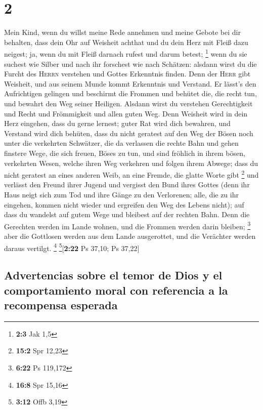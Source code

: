 \hypertarget{section-1}{%
\section{2}\label{section-1}}

 Mein Kind, wenn du willst meine Rede annehmen und meine
Gebote bei dir behalten,  dass dein Ohr auf Weisheit
achthat und du dein Herz mit Fleiß dazu neigest;  ja, wenn
du mit Fleiß darnach rufest und darum betest; \footnote{\textbf{2:3} Jak
  1,5}  wenn du sie suchest wie Silber und nach ihr
forschest wie nach Schätzen:  alsdann wirst du die Furcht
des \textsc{Herrn} verstehen und Gottes Erkenntnis finden.
 Denn der \textsc{Herr} gibt Weisheit, und aus seinem
Munde kommt Erkenntnis und Verstand.  Er lässt's den
Aufrichtigen gelingen und beschirmt die Frommen  und
behütet die, die recht tun, und bewahrt den Weg seiner Heiligen.
 Alsdann wirst du verstehen Gerechtigkeit und Recht und
Frömmigkeit und allen guten Weg.  Denn Weisheit wird in
dein Herz eingehen, dass du gerne lernest;  guter Rat
wird dich bewahren, und Verstand wird dich behüten,  dass
du nicht geratest auf den Weg der Bösen noch unter die verkehrten
Schwätzer,  die da verlassen die rechte Bahn und gehen
finstere Wege,  die sich freuen, Böses zu tun, und sind
fröhlich in ihrem bösen, verkehrten Wesen,  welche ihren
Weg verkehren und folgen ihrem Abwege;  dass du nicht
geratest an eines anderen Weib, an eine Fremde, die glatte Worte gibt
\footnote{\textbf{15:2} Spr 12,23}  und verlässt den
Freund ihrer Jugend und vergisst den Bund ihres Gottes 
(denn ihr Haus neigt sich zum Tod und ihre Gänge zu den Verlorenen;
 alle, die zu ihr eingehen, kommen nicht wieder und
ergreifen den Weg des Lebens nicht);  auf dass du
wandelst auf gutem Wege und bleibest auf der rechten Bahn.
 Denn die Gerechten werden im Lande wohnen, und die
Frommen werden darin bleiben; \footnote{\textbf{6:22} Ps 119,172}
 aber die Gottlosen werden aus dem Lande ausgerottet, und
die Verächter werden daraus vertilgt. \footnote{\textbf{16:8} Spr 15,16}
\footnote{\textbf{3:12} Offb 3,19}{[}\textbf{2:22} Ps 37,10; Ps 37,22{]}

\hypertarget{advertencias-sobre-el-temor-de-dios-y-el-comportamiento-moral-con-referencia-a-la-recompensa-esperada}{%
\subsection{Advertencias sobre el temor de Dios y el comportamiento
moral con referencia a la recompensa
esperada}\label{advertencias-sobre-el-temor-de-dios-y-el-comportamiento-moral-con-referencia-a-la-recompensa-esperada}}

